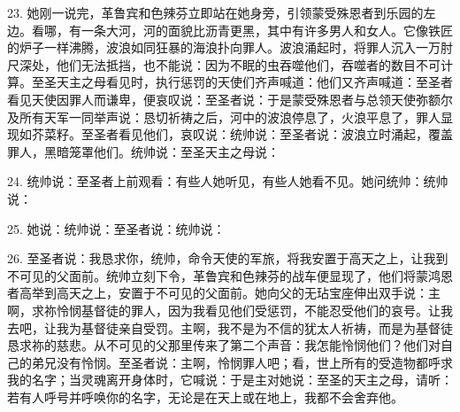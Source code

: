 23. 她刚一说完，革鲁宾和色辣芬立即站在她身旁，引领蒙受殊恩者到乐园的左边。看哪，有一条大河，河的面貌比沥青更黑，其中有许多男人和女人。它像铁匠的炉子一样沸腾，波浪如同狂暴的海浪扑向罪人。波浪涌起时，将罪人沉入一万肘尺深处，他们无法抵挡，也不能说：因为不眠的虫吞噬他们，吞噬者的数目不可计算。至圣天主之母看见时，执行惩罚的天使们齐声喊道：他们又齐声喊道：至圣者看见天使因罪人而谦卑，便哀叹说：至圣者说：于是蒙受殊恩者与总领天使弥额尔及所有天军一同举声说：恳切祈祷之后，河中的波浪停息了，火浪平息了，罪人显现如芥菜籽。至圣者看见他们，哀叹说：统帅说：至圣者说：波浪立时涌起，覆盖罪人，黑暗笼罩他们。统帅说：至圣天主之母说：\par

24. 统帅说：至圣者上前观看：有些人她听见，有些人她看不见。她问统帅：统帅说：\par

25. 她说：统帅说：至圣者说：统帅说：\par

26. 至圣者说：我恳求你，统帅，命令天使的军旅，将我安置于高天之上，让我到不可见的父面前。统帅立刻下令，革鲁宾和色辣芬的战车便显现了，他们将蒙鸿恩者高举到高天之上，安置于不可见的父面前。她向父的无玷宝座伸出双手说：主啊，求祢怜悯基督徒的罪人，因为我看见他们受惩罚，不能忍受他们的哀号。让我去吧，让我为基督徒亲自受罚。主啊，我不是为不信的犹太人祈祷，而是为基督徒恳求祢的慈悲。从不可见的父那里传来了第二个声音：我怎能怜悯他们？他们对自己的弟兄没有怜悯。至圣者说：主啊，怜悯罪人吧；看，世上所有的受造物都呼求我的名字；当灵魂离开身体时，它喊说：于是主对她说：至圣的天主之母，请听：若有人呼号并呼唤你的名字，无论是在天上或在地上，我都不会舍弃他。\par

